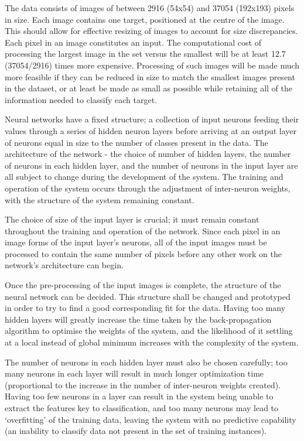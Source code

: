 The data consists of images of between 2916 (54x54) and 37054 (192x193) pixels in size. Each image contains one target, positioned at the centre of the image. This should allow for effective resizing of images to account for size discrepancies. Each pixel in an image constitutes an input. The computational cost of processing the largest image in the set versus the smallest will be at least 12.7 (37054/2916) times more expensive. Processing of such images will be made much more feasible if they can be reduced in size to match the smallest images present in the dataset, or at least be made as small as possible while retaining all of the information needed to classify each target.

Neural networks have a fixed structure; a collection of input neurons feeding their values through a series of hidden neuron layers before arriving at an output layer of neurons equal in size to the number of classes present in the data. The architecture of the network - the choice of number of hidden layers, the number of neurons in each hidden layer, and the number of neurons in the input layer are all subject to change during the development of the system. The training and operation of the system occurs through the adjustment of inter-neuron weights, with the structure of the system remaining constant.

The choice of size of the input layer is crucial; it must remain constant throughout the training and operation of the network. Since each pixel in an image forms of the input layer's neurons, all of the input images must be processed to contain the same number of pixels before any other work on the network's architecture can begin.

Once the pre-processing of the input images is complete, the structure of the neural network can be decided. This structure shall be changed and prototyped in order to try to find a good corresponding fit for the data. Having too many hidden layers will greatly increase the time taken by the back-propagation algorithm to optimise the weights of the system, and the likelihood of it settling at a local instead of global minimum increases with the complexity of the system. 

The number of neurons in each hidden layer must also be chosen carefully; too many neurons in each layer will result in much longer optimization time (proportional to the increase in the number of inter-neuron weights created). Having too few neurons in a layer can result in the system being unable to extract the features key to classification, and too many neurons may lead to `overfitting' of the training data, leaving the system with no predictive capability (an inability to classify data not present in the set of training instances).


